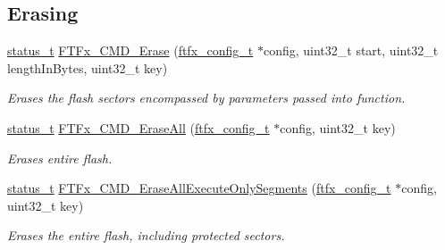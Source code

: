 \subsection*{Erasing}
\begin{DoxyCompactItemize}
\item 
\mbox{\hyperlink{group__ksdk__common_gaaabdaf7ee58ca7269bd4bf24efcde092}{status\+\_\+t}} \mbox{\hyperlink{group__ftfx__controller_ga980b0cb86989aedb55096ebe53036eb3}{F\+T\+Fx\+\_\+\+C\+M\+D\+\_\+\+Erase}} (\mbox{\hyperlink{group__ftfx__controller_gab0196063c05bffb4cd2f249699a3378c}{ftfx\+\_\+config\+\_\+t}} $\ast$config, uint32\+\_\+t start, uint32\+\_\+t length\+In\+Bytes, uint32\+\_\+t key)
\begin{DoxyCompactList}\small\item\em Erases the flash sectors encompassed by parameters passed into function. \end{DoxyCompactList}\item 
\mbox{\hyperlink{group__ksdk__common_gaaabdaf7ee58ca7269bd4bf24efcde092}{status\+\_\+t}} \mbox{\hyperlink{group__ftfx__controller_ga709bc9b9e66e213dfd00e53f1e90542b}{F\+T\+Fx\+\_\+\+C\+M\+D\+\_\+\+Erase\+All}} (\mbox{\hyperlink{group__ftfx__controller_gab0196063c05bffb4cd2f249699a3378c}{ftfx\+\_\+config\+\_\+t}} $\ast$config, uint32\+\_\+t key)
\begin{DoxyCompactList}\small\item\em Erases entire flash. \end{DoxyCompactList}\item 
\mbox{\hyperlink{group__ksdk__common_gaaabdaf7ee58ca7269bd4bf24efcde092}{status\+\_\+t}} \mbox{\hyperlink{group__ftfx__controller_gaf73f451480c5a91e94de5d65c5206876}{F\+T\+Fx\+\_\+\+C\+M\+D\+\_\+\+Erase\+All\+Execute\+Only\+Segments}} (\mbox{\hyperlink{group__ftfx__controller_gab0196063c05bffb4cd2f249699a3378c}{ftfx\+\_\+config\+\_\+t}} $\ast$config, uint32\+\_\+t key)
\begin{DoxyCompactList}\small\item\em Erases the entire flash, including protected sectors. \end{DoxyCompactList}\end{DoxyCompactItemize}
